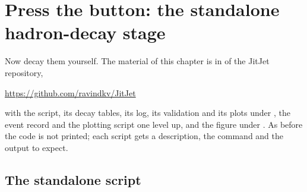 \section{Press the button: the standalone hadron-decay stage}
\label{sec:children_producing_grandchildren:standalone_code}

Now decay them yourself. The material of this chapter is in
 of the JitJet repository,
\begin{center}
  \url{https://github.com/ravindkv/JitJet}
\end{center}
with the script, its decay tables, its log, its validation and its plots
under , the event record and the plotting
script one level up, and the \CMSSW figure under .
As before the code is not printed; each script gets a description, the
command and the output to expect.

\subsection{The standalone script}

